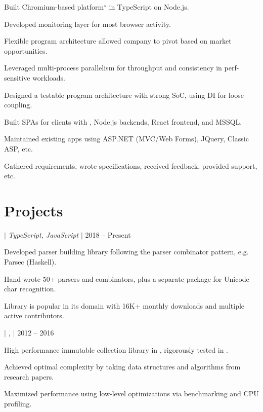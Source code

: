 \documentclass[a4paper,11pt]{article}
\begin{document}
\begin{sectionList}
    \begin{jobReflectizDev}
        \item Built Chromium-based platform$^\star$ in TypeScript on Node.js.
        \item Developed monitoring layer for most browser activity.
        \item Flexible program architecture allowed company to pivot based on market opportunities.
        \item Leveraged multi-process parallelism for throughput and consistency in perf-sensitive workloads.
        \item Designed a testable program architecture with strong SoC, using DI for loose coupling.
    \end{jobReflectizDev}
    \begin{jobEternitech}
        \item Built SPAs for clients with , Node.js backends, React frontend, and MSSQL.\@
        \item Maintained existing apps using ASP.NET (MVC/Web Forms), JQuery, Classic ASP, etc.
        \item Gathered requirements, wrote specifications, received feedback, provided support, etc.
    \end{jobEternitech}
\end{sectionList}%


\section{Projects}
\begin{sectionList}%
    \begin{project}{\textbf{\parjs} $|$ \emph{TypeScript, JavaScript} $|$ }{2018 -- Present}
        \item Developed parser building library following the parser combinator pattern, e.g. Parsec (Haskell).
        \item Hand-wrote 50+ parsers and combinators, plus a separate package for Unicode char recognition.
        \item Library is popular in its domain with 16K+ monthly downloads and multiple active contributors.
    \end{project}
    \begin{project}{\textbf{\imms} $|$ \emph{, } $|$ }{2012 -- 2016}
        \item High performance immutable collection library in , rigorously tested in .
        \item Achieved optimal complexity by taking data structures and algorithms from research papers.
        \item Maximized performance using low-level optimizations via benchmarking and CPU profiling.
    \end{project}
\end{sectionList}%

\end{document}
